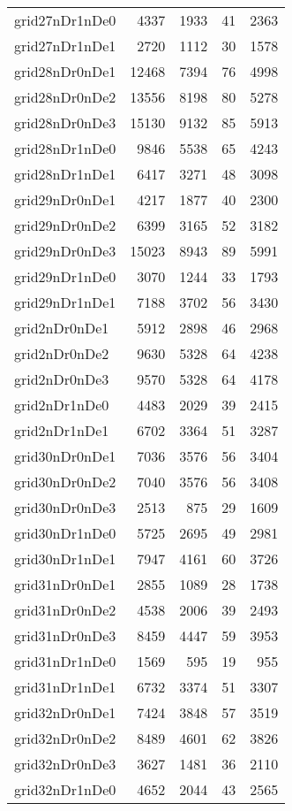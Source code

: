 \begin{longtable}{lrrrr}
grid27nDr1nDe0 & 4337 & 1933 & 41 & 2363 \\
grid27nDr1nDe1 & 2720 & 1112 & 30 & 1578 \\
grid28nDr0nDe1 & 12468 & 7394 & 76 & 4998 \\
grid28nDr0nDe2 & 13556 & 8198 & 80 & 5278 \\
grid28nDr0nDe3 & 15130 & 9132 & 85 & 5913 \\
grid28nDr1nDe0 & 9846 & 5538 & 65 & 4243 \\
grid28nDr1nDe1 & 6417 & 3271 & 48 & 3098 \\
grid29nDr0nDe1 & 4217 & 1877 & 40 & 2300 \\
grid29nDr0nDe2 & 6399 & 3165 & 52 & 3182 \\
grid29nDr0nDe3 & 15023 & 8943 & 89 & 5991 \\
grid29nDr1nDe0 & 3070 & 1244 & 33 & 1793 \\
grid29nDr1nDe1 & 7188 & 3702 & 56 & 3430 \\
grid2nDr0nDe1 & 5912 & 2898 & 46 & 2968 \\
grid2nDr0nDe2 & 9630 & 5328 & 64 & 4238 \\
grid2nDr0nDe3 & 9570 & 5328 & 64 & 4178 \\
grid2nDr1nDe0 & 4483 & 2029 & 39 & 2415 \\
grid2nDr1nDe1 & 6702 & 3364 & 51 & 3287 \\
grid30nDr0nDe1 & 7036 & 3576 & 56 & 3404 \\
grid30nDr0nDe2 & 7040 & 3576 & 56 & 3408 \\
grid30nDr0nDe3 & 2513 & 875 & 29 & 1609 \\
grid30nDr1nDe0 & 5725 & 2695 & 49 & 2981 \\
grid30nDr1nDe1 & 7947 & 4161 & 60 & 3726 \\
grid31nDr0nDe1 & 2855 & 1089 & 28 & 1738 \\
grid31nDr0nDe2 & 4538 & 2006 & 39 & 2493 \\
grid31nDr0nDe3 & 8459 & 4447 & 59 & 3953 \\
grid31nDr1nDe0 & 1569 & 595 & 19 & 955 \\
grid31nDr1nDe1 & 6732 & 3374 & 51 & 3307 \\
grid32nDr0nDe1 & 7424 & 3848 & 57 & 3519 \\
grid32nDr0nDe2 & 8489 & 4601 & 62 & 3826 \\
grid32nDr0nDe3 & 3627 & 1481 & 36 & 2110 \\
grid32nDr1nDe0 & 4652 & 2044 & 43 & 2565 \\

\end{longtable}
